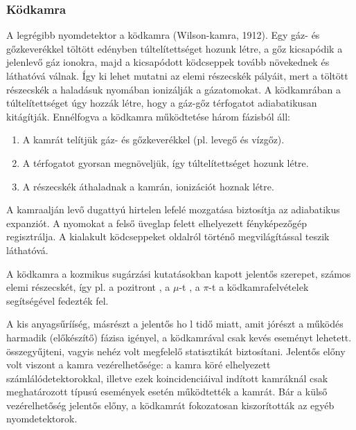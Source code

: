 \documentclass[../main.tex]{subfiles}
\begin{document}
\subsubsection*{Ködkamra}
A legrégibb nyomdetektor a ködkamra (Wilson-kamra, 1912). Egy gáz- és gőzkeverékkel töltött edényben túltelítettséget hozunk létre, a gőz kicsapódik a jelenlevő gáz ionokra, majd a kicsapódott ködcseppek tovább növekednek és láthatóvá válnak. Így ki lehet mutatni az elemi részecskék pályáit, mert a töltött részecskék a haladásuk nyomában ionizálják a gázatomokat.
A ködkamrában a túltelítettséget úgy hozzák létre, hogy a gáz-gőz
térfogatot adiabatikusan kitágítják. Ennélfogva a ködkamra működtetése
három fázisból áll:
\begin{enumerate}
    \item A kamrát telítjük gáz- és gőzkeverékkel (pl. levegő és vízgőz).
    \item A térfogatot gyorsan megnöveljük, így túltelítettséget hozunk létre.
    \item A részecskék áthaladnak a kamrán, ionizációt hoznak létre.
\end{enumerate}
A kamraalján levő dugattyú hirtelen lefelé mozgatása biztosítja az
adiabatikus expanziót. A nyomokat a
felső üveglap felett elhelyezett fényképezőgép regisztrálja. A kialakult ködcseppeket oldalról történő megvilágítással teszik láthatóvá.

A ködkamra a kozmikus sugárzási kutatásokban kapott jelentős szerepet, számos elemi részecskét, így pl. a pozitront , a $\mu$-t , a $\pi$-t a ködkamrafelvételek segítségével fedezték fel.

A kis anyagsűrííség, másrészt a jelentős ho l tidő miatt, amit jórészt a
működés harmadik (előkészítő) fázisa igényel, a ködkamrával csak kevés
eseményt lehetett. összegyűjteni, vagyis nehéz volt megfelelő statisztikát biztosítani. Jelentős előny volt viszont a kamra vezérelhetősége: a kamra köré
elhelyezett számlálódetektorokkal, illetve ezek koincidenciáival indított kamráknál csak meghatározott típusú események esetén működtették a kamrát.
Bár a külső vezérelhetőség jelentős előny, a ködkamrát fokozatosan kiszorították az egyéb nyomdetektorok.
\end{document}
